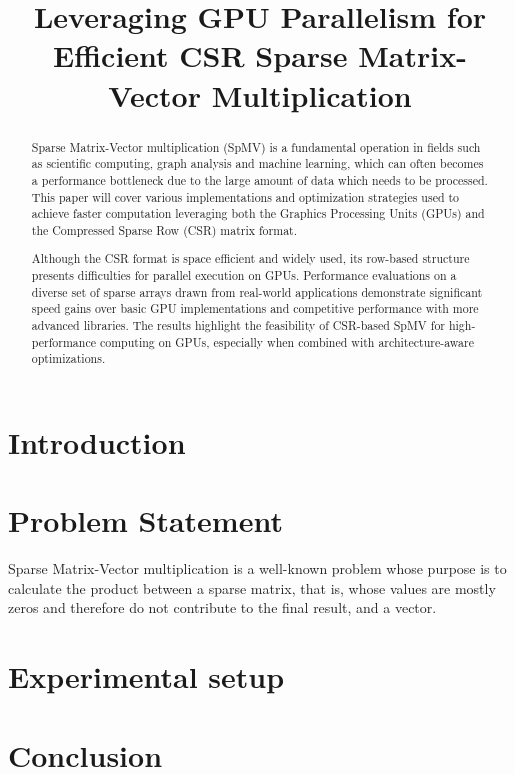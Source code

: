 \documentclass[conference]{IEEEtran}
\title{Leveraging GPU Parallelism for Efficient CSR Sparse Matrix-Vector Multiplication}
\author{
    \IEEEauthorblockN{Antonio Gelain}
    \IEEEauthorblockA{
        \textit{Department of Information Engineering and Computer Science} \\
        \textit{University of Trento} \\
        Trento, Italy \\
        antonio.gelain@studenti.unitn.it
    }
}
\begin{document}
    \maketitle

    \begin{abstract}
        Sparse Matrix-Vector multiplication (SpMV) is a fundamental operation
        in fields such as scientific computing, graph analysis and machine
        learning, which can often becomes a performance bottleneck due to the
        large amount of data which needs to be processed.
        This paper will cover various implementations and optimization strategies
        used to achieve faster computation leveraging both the Graphics Processing
        Units (GPUs) and the Compressed Sparse Row (CSR) matrix format.

        Although the CSR format is space efficient and widely used, its row-based
        structure presents difficulties for parallel execution on GPUs.
        Performance evaluations on a diverse set of sparse arrays drawn from
        real-world applications demonstrate significant speed gains over basic
        GPU implementations and competitive performance with more advanced libraries.
        The results highlight the feasibility of CSR-based SpMV for high-performance
        computing on GPUs, especially when combined with architecture-aware optimizations.
    \end{abstract}

    \section{Introduction} 

    
    \section{Problem Statement}
    Sparse Matrix-Vector multiplication is a well-known problem whose purpose
    is to calculate the product between a sparse matrix, that is, whose values
    are mostly zeros and therefore do not contribute to the final result, and a
    vector.



    \section{Experimental setup}

    \section{Conclusion}
\end{document}

